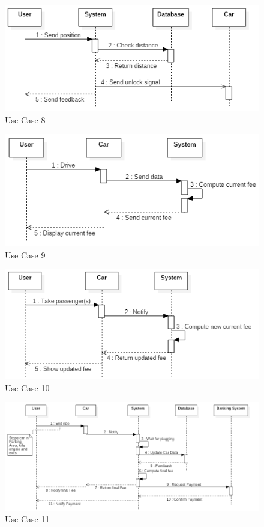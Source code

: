 \FloatBarrier
\begin{figure}[h]
\centering
\includegraphics[width=\linewidth,keepaspectratio]{../Diagrams/SD/UC_8.png}
\caption{Use Case 8}
\end{figure}
\FloatBarrier
\begin{figure}[h]
\centering
\includegraphics[width=\linewidth,keepaspectratio]{../Diagrams/SD/UC_9.png}
\caption{Use Case 9}
\end{figure}
\FloatBarrier
\begin{figure}[h]
\centering
\includegraphics[width=\linewidth,keepaspectratio]{../Diagrams/SD/UC_10.png}
\caption{Use Case 10}
\end{figure}
\FloatBarrier
\begin{figure}[h]
\centering
\includegraphics[width=\linewidth,keepaspectratio]{../Diagrams/SD/UC_11.png}
\caption{Use Case 11}
\end{figure}
